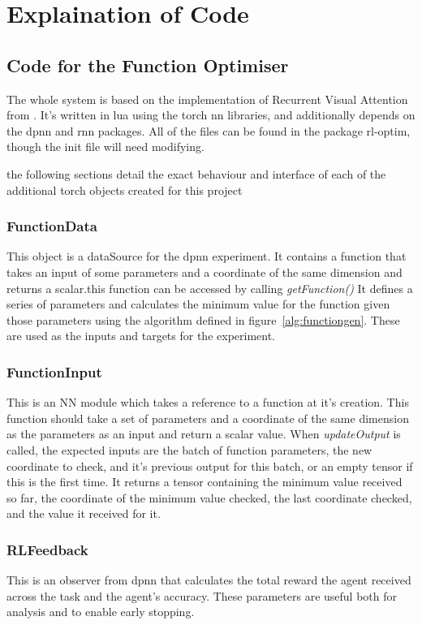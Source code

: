 \appendix

\section{Explaination of Code}

\subsection{Code for the Function Optimiser}
The whole system is based on the implementation of Recurrent Visual Attention from \cite{Torch:RVA}. It's written in lua using the torch nn libraries, and additionally depends on the dpnn and rnn packages. All of the files can be found in the package rl-optim, though the init file will need modifying.

the following sections detail the exact behaviour and interface of each of the additional torch objects created for this project
\subsubsection{FunctionData}
This object is a dataSource for the dpnn experiment. It contains a function that takes an input of some parameters and a coordinate of the same dimension and returns a scalar.this function can be accessed by calling \emph{getFunction()} It defines a series of parameters and calculates the minimum value for the function given those parameters using the algorithm defined in figure~\ref{alg:functiongen}. These are used as the inputs and targets for the experiment.

\subsubsection{FunctionInput}
This is an NN module which takes a reference to a function at it's creation. This function should take a set of parameters and a coordinate of the same dimension as the parameters as an input and return a scalar value. When \emph{updateOutput} is called, the expected inputs are the batch of function parameters, the new coordinate to check, and it's previous output for this batch, or an empty tensor if this is the first time. It returns a tensor containing the minimum value received so far, the coordinate of the minimum value checked, the last coordinate checked, and the value it received for it. 
\subsubsection{RLFeedback}
This is an observer from dpnn that calculates the total reward the agent received across the task and the agent's accuracy. These parameters are useful both for analysis and to enable early stopping.
